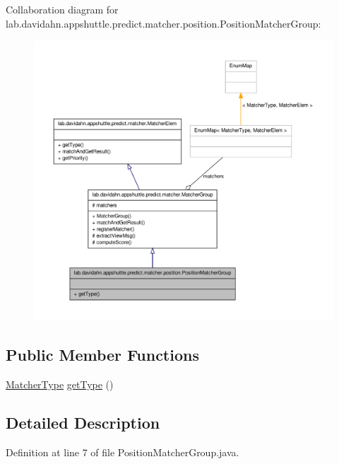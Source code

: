 \-Collaboration diagram for lab.\-davidahn.\-appshuttle.\-predict.\-matcher.\-position.\-Position\-Matcher\-Group\-:
\nopagebreak
\begin{figure}[H]
\begin{center}
\leavevmode
\includegraphics[width=350pt]{classlab_1_1davidahn_1_1appshuttle_1_1predict_1_1matcher_1_1position_1_1_position_matcher_group__coll__graph}
\end{center}
\end{figure}
\subsection*{\-Public \-Member \-Functions}
\begin{DoxyCompactItemize}
\item 
\hyperlink{enumlab_1_1davidahn_1_1appshuttle_1_1predict_1_1matcher_1_1_matcher_type}{\-Matcher\-Type} \hyperlink{classlab_1_1davidahn_1_1appshuttle_1_1predict_1_1matcher_1_1position_1_1_position_matcher_group_adcfda7d74f5678d8753ec6fc8efb2729}{get\-Type} ()
\end{DoxyCompactItemize}


\subsection{\-Detailed \-Description}


\-Definition at line 7 of file \-Position\-Matcher\-Group.\-java.




